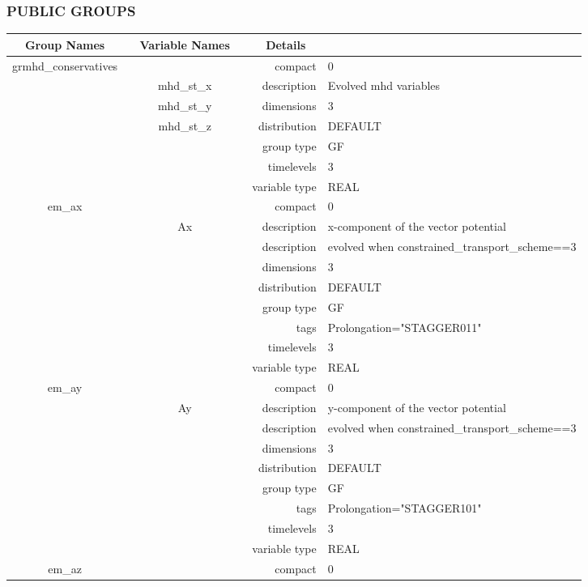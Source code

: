 \vspace{5mm}\subsubsection{PUBLIC GROUPS}

\vspace{5mm}

\begin{tabular*}{150mm}{|c|c@{\extracolsep{\fill}}|rl|} \hline 
~ {\bf Group Names} ~ & ~ {\bf Variable Names} ~  &{\bf Details} ~ & ~\\ 
\hline 
grmhd\_conservatives &  & compact & 0 \\ 
 & mhd\_st\_x & description & Evolved mhd variables \\ 
 & mhd\_st\_y & dimensions & 3 \\ 
 & mhd\_st\_z & distribution & DEFAULT \\ 
 &  & group type & GF \\ 
 &  & timelevels & 3 \\ 
 &  & variable type & REAL \\ 
\hline 
em\_ax &  & compact & 0 \\ 
 & Ax & description & x-component of the vector potential \\ 
& ~ & description &  evolved when constrained\_transport\_scheme==3 \\ 
 &  & dimensions & 3 \\ 
 &  & distribution & DEFAULT \\ 
 &  & group type & GF \\ 
 &  & tags & Prolongation="STAGGER011" \\ 
 &  & timelevels & 3 \\ 
 &  & variable type & REAL \\ 
\hline 
em\_ay &  & compact & 0 \\ 
 & Ay & description & y-component of the vector potential \\ 
& ~ & description &  evolved when constrained\_transport\_scheme==3 \\ 
 &  & dimensions & 3 \\ 
 &  & distribution & DEFAULT \\ 
 &  & group type & GF \\ 
 &  & tags & Prolongation="STAGGER101" \\ 
 &  & timelevels & 3 \\ 
 &  & variable type & REAL \\ 
\hline 
em\_az &  & compact & 0 \\ 

\end{tabular*}
